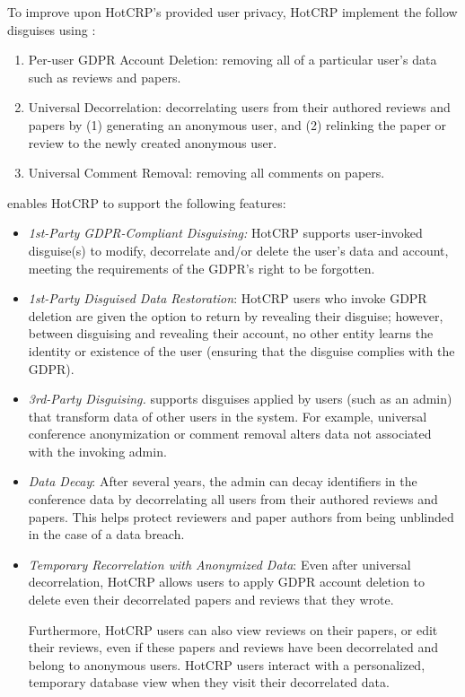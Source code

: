 To improve upon HotCRP's provided user privacy, HotCRP implement the follow disguises using \sys:
\begin{enumerate}
    \item Per-user GDPR Account Deletion: removing all of a particular user's data such as reviews and papers.
    \item Universal Decorrelation: decorrelating users from
        their authored reviews and papers by (1) generating an
        anonymous user, and (2) relinking the paper or review
        to the newly created anonymous user.
    \item Universal Comment Removal: removing all comments on papers.
\end{enumerate}
\sys enables HotCRP to support the following features:
\begin{itemize}
    \item\emph{1st-Party GDPR-Compliant Disguising:}
HotCRP supports user-invoked disguise(s) to modify, decorrelate and/or delete the user's data and
account, meeting the requirements of the GDPR's right to be forgotten.

    \item \emph{1st-Party Disguised Data Restoration}: HotCRP users who invoke GDPR deletion are given the
        option to return by revealing their disguise; however, between disguising and revealing
        their account, no other entity learns the identity or existence of the user (ensuring that
        the disguise complies with the GDPR).

    \item\emph{3rd-Party Disguising.}
\sys supports disguises applied by users (such as an admin) that transform data of other users in the system. For example, universal conference anonymization or
    comment removal alters data not associated with the invoking admin.

\item \emph{Data Decay}: After several years, the admin can decay identifiers in the conference data
    by decorrelating all users from their authored reviews and papers.  This helps protect reviewers
        and paper authors from being unblinded in the case of a data breach.

\item \emph{Temporary Recorrelation with Anonymized Data}: 
Even after universal decorrelation, HotCRP allows users to apply GDPR account
deletion to delete even their decorrelated papers and reviews that they wrote.
%

%
Furthermore, HotCRP users can also view reviews on their papers, or edit their reviews, even if
        these papers and reviews have been decorrelated and belong to anonymous users.  HotCRP users
        interact with a personalized, temporary database view when they visit their decorrelated
        data. 


\end{itemize}
